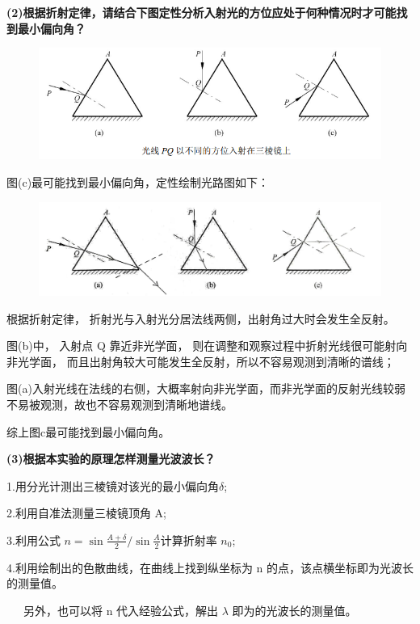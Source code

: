 \documentclass[UTF8]{ctexart}
\begin{document}
\noindent  \textbf{(2)根据折射定律，请结合下图定性分析入射光的方位应处于何种情况时才可能找到最小偏向角？}

\begin{figure}[H]
    \centering
    \includegraphics[scale=0.9]{思考题.png}
\end{figure}

图(c)最可能找到最小偏向角，定性绘制光路图如下：

\begin{figure}[H]
    \centering
    \includegraphics[scale=0.09]{手绘光路.jpg}
\end{figure}

根据折射定律， 折射光与入射光分居法线两侧，出射角过大时会发生全反射。 

图(b)中， 入射点 Q 靠近非光学面， 则在调整和观察过程中折射光线很可能射向非光学面，
而且出射角较大可能发生全反射，所以不容易观测到清晰的谱线； 

图(a)入射光线在法线的右侧，大概率射向非光学面，而非光学面的反射光线较弱不易被观测，故也不容易观测到清晰地谱线。

综上图c最可能找到最小偏向角。

\noindent  \textbf{(3)根据本实验的原理怎样测量光波波长？}

1.用分光计测出三棱镜对该光的最小偏向角$\delta$;

2.利用自准法测量三棱镜顶角 A;

3.利用公式 $n=\sin \frac{A+\delta}{2} / \sin \frac{A}{2}$计算折射率 $n_0$;

4.利用绘制出的色散曲线，在曲线上找到纵坐标为 n 的点，该点横坐标即为光波长的测量值。

~~~另外，也可以将 n 代入经验公式，解出 $\lambda$ 即为的光波长的测量值。
\end{document}
